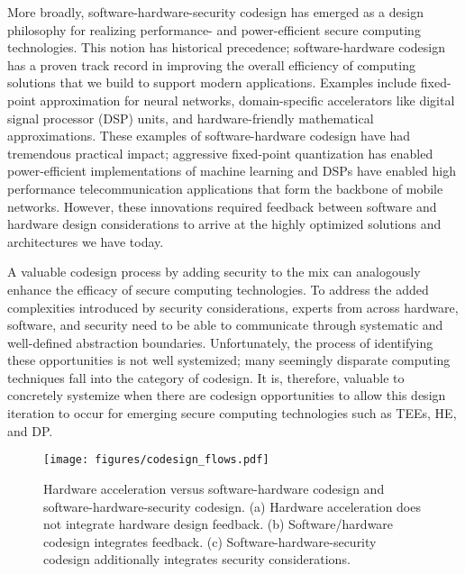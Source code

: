 More broadly, software-hardware-security codesign has emerged as a design philosophy for realizing performance- and power-efficient secure computing technologies.
This notion has historical precedence; software-hardware codesign has a proven track record in improving the overall efficiency of computing solutions that we build to support modern applications.
Examples include fixed-point approximation for neural networks, domain-specific accelerators like digital signal processor (DSP) units, and hardware-friendly mathematical approximations.
These examples of software-hardware codesign have had tremendous practical impact; aggressive fixed-point quantization has enabled power-efficient implementations of machine learning and DSPs have enabled high performance telecommunication applications that form the backbone of mobile networks.
However, these innovations required feedback between software and hardware design considerations to arrive at the highly optimized solutions and architectures we have today.

A valuable codesign process by adding security to the mix can analogously enhance the efficacy of secure computing technologies.
To address the added complexities introduced by security considerations, experts from across hardware, software, and security need to be able to communicate through systematic and well-defined abstraction boundaries.
Unfortunately, the process of identifying these opportunities is not well systemized; many seemingly disparate computing techniques fall into the category of codesign.
It is, therefore, valuable to concretely systemize when there are codesign opportunities to allow this design iteration to occur for emerging secure computing technologies such as TEEs, HE, and DP.

{
\setlength{\belowcaptionskip}{-2mm}
\begin{figure}[t]
    \centering
    \texttt{[image: figures/codesign\_flows.pdf]}
    \caption{Hardware acceleration versus software-hardware codesign and software-hardware-security codesign. (a) Hardware acceleration does not integrate hardware design feedback. (b) Software/hardware codesign integrates feedback. (c) Software-hardware-security codesign additionally integrates security considerations.
    }
    \label{fig:sw_hw_codesign}
\end{figure}
}

